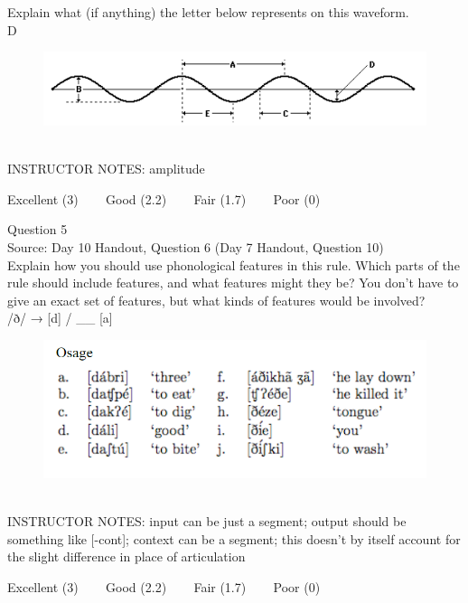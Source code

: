 \documentclass[12pt]{article}
\begin{document}
Explain what (if anything) the letter below represents on this waveform.\\

D

\begin{figure}[H]
\includegraphics{../images/sinusoid.png}
\end{figure}

~\\
INSTRUCTOR NOTES: amplitude


\vfill
Excellent (3) ~~~ Good (2.2) ~~~ Fair (1.7) ~~~ Poor (0)
\newpage

{\large Question 5}\\

Source: Day 10 Handout, Question 6 (Day 7 Handout, Question 10)\\

Explain how you should use phonological features in this rule. Which parts of the rule should include features, and what features might they be? You don't have to give an exact set of features, but what kinds of features would be involved?\\

/ð/ → {[d]} / \_\_ {[a]}

\begin{figure}[H]
\includegraphics{../images/osage.png}
\end{figure}

~\\
INSTRUCTOR NOTES: input can be just a segment; output should be something like [-cont]; context can be a segment; this doesn't by itself account for the slight difference in place of articulation


\vfill
Excellent (3) ~~~ Good (2.2) ~~~ Fair (1.7) ~~~ Poor (0)
\newpage
\end{document}
